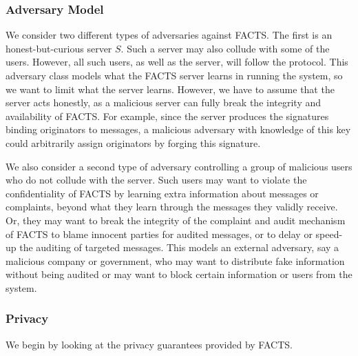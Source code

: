 

\subsubsection{Adversary Model}
We consider two different types of adversaries against FACTS.  The first is an honest-but-curious server $S$.  Such a server may also collude with some of the users.  However, all such users, as well as the server, will follow the protocol.  This adversary class models what the FACTS server learns in running the system, so we want to limit what the server learns.  However, we have to assume that the server acts honestly, as a malicious server can fully break the integrity and availability of FACTS.  For example, since the server produces the signatures binding originators to messages, a malicious adversary with knowledge of this key could arbitrarily assign originators by forging this signature.

We also consider a second type of adversary controlling a group of malicious users who do not collude with the server.  Such users may want to violate the confidentiality of FACTS by learning extra information about messages or complaints, beyond what they learn through the messages they validly receive.  Or, they may want to break the integrity of the complaint and audit mechanism of FACTS to blame innocent parties for audited messages, or to delay or speed-up the auditing of targeted messages.  This models an external adversary, say a malicious company or government, who may want to distribute fake information without being audited or may want to block certain information or users from the system.

\subsubsection{Privacy}
We begin by looking at the privacy guarantees provided by FACTS.

